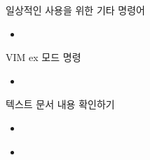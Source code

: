 \documentclass[aspectratio=1610,20pt,xcolor=pdftex,dvipsnames,table,handout]{beamer}
\begin{document}
		\begin{frame} [t,plain]

			\begin{block} {일상적인 사용을 위한 기타 명령어}
			\setlength{\leftmargini}{2em}			
			\begin{itemize}
				\item 
			\end{itemize}
			\end{block}						

		\end{frame}			

		\begin{frame} [t,plain]

			\begin{block} {VIM ex 모드 명령}
			\setlength{\leftmargini}{2em}			
			\begin{itemize}
				\item 
			\end{itemize}
			\end{block}						

		\end{frame}			



		\begin{frame} [t,plain]

			\begin{block} {텍스트 문서 내용 확인하기}
			\setlength{\leftmargini}{2em}			
			\begin{itemize}
				\item 
			\end{itemize}
			\end{block}						


		\end{frame}			


		\begin{frame} [t,plain]

			\begin{block} {}
			\setlength{\leftmargini}{2em}			
			\begin{itemize}
				\item 
			\end{itemize}
			\end{block}						


		\end{frame}			
\end{document}
